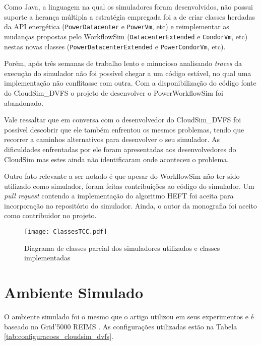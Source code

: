 Como Java, a linguagem na qual os simuladores foram desenvolvidos, não possui
suporte a herança múltipla a estratégia empregada foi a de criar classes
herdadas da API energética (\texttt{PowerDatacenter} e \texttt{PowerVm}, etc) e
reimplementar as mudanças propostas pelo WorkflowSim
(\texttt{DatacenterExtended} e \texttt{CondorVm}, etc) nestas novas
classes (\texttt{PowerDatacenterExtended} e \texttt{PowerCondorVm}, etc).

Porém, após três semanas de trabalho lento e minucioso analisando \emph{traces}
da execução do simulador não foi possível chegar a um código estável, no qual
uma implementação não conflitasse com outra. Com a disponibilização
do código fonte do CloudSim\_DVFS o projeto de desenvolver o PowerWorkflowSim
foi abandonado.

Vale ressaltar que em conversa com o desenvolvedor do CloudSim\_DVFS foi
possível descobrir que ele também enfrentou os mesmos problemas, tendo que
recorrer a caminhos alternativos para desenvolver o seu simulador. As
dificuldades enfrentadas por ele foram apresentadas aos desenvolvedores do
CloudSim mas estes ainda não identificaram onde aconteceu o problema.

Outro fato relevante a ser notado é que apesar do WorkflowSim não ter sido
utilizado como simulador, foram feitas contribuições ao código do simulador.
Um \emph{pull request} contendo a implementação do algoritmo HEFT foi aceita
para incorporação no repositório do simulador. Ainda, o autor da monografia
foi aceito como contribuidor no projeto.

\begin{figure}[ht]
\centering
\texttt{[image: ClassesTCC.pdf]}
\caption{Diagrama de classes parcial dos simuladores utilizados e classes
implementadas}
\label{fig:classes_simuladores}
\end{figure}

\section{Ambiente Simulado}
\label{sec:ambiente_simulado}

O ambiente simulado foi o mesmo que o artigo
\cite{guerout:energy_aware_simulation} utilizou em seus experimentos e é baseado
no Grid'5000 REIMS \cite{cappello:grid5000}. As configurações utilizadas estão
na Tabela \ref{tab:configuracoes_cloudsim_dvfs}.

